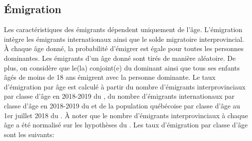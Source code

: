 \documentclass[letterpaper,10pt,french]{sphinxmanual}
\begin{document}
\subsection{Émigration}
\label{\detokenize{methodologie:emigration}}
Les caractéristiques des émigrants dépendent uniquement de l’âge. L’émigration intègre les émigrants internationaux ainsi que le solde migratoire interprovincial. À chaque âge donné, la probabilité d’émigrer est égale pour toutes les personnes dominantes. Les émigrants d’un âge donné sont tirés de manière aléatoire. De plus, on considère que le(la) conjoint(e) du dominant ainsi que tous ses enfants âgés de moins de 18 ans émigrent avec la personne dominante. Le taux d’émigration par âge est calculé à partir du nombre d’émigrants interprovinciaux par classe d’âge en 2018-2019 du , du nombre d’émigrants internationaux par classe d’âge en 2018-2019 du  et de la population québécoise par classe d’âge au 1er juillet 2018 du . À noter que le nombre d’émigrants interprovinciaux à chaque âge a été normalisé sur les hypothèses du . Les taux d’émigration par classe d’âge sont les suivants:
\end{document}
